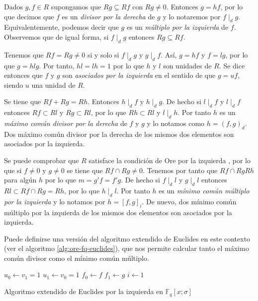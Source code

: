 Dados \(g, f \in R\) supongamos que \(Rg \subseteq Rf\) con \(Rg \neq 0\).
Entonces \(g = hf\), por lo que decimos que \(f\) es un \emph{divisor por la derecha} de \(g\) y lo notaremos por \(f \mid_{d} g\).
Equivalentemente, podemos decir que \(g\) es un \emph{múltiplo por la izquierda} de \(f\).
Observemos que de igual forma, si \(f \mid_{d} g\) entonces \(Rg \subseteq Rf\).

Tenemos que \(Rf = Rg \neq 0\) si y solo si \(f \mid_d g\) y \(g \mid_d f\).
Así, \(g = hf\) y \(f = lg\), por lo que \(g = hlg\).
Por tanto, \(hl = lh = 1\) por lo que \(h\) y \(l\) son unidades de \(R\).
Se dice entonces que \(f\) y \(g\) son \emph{asociados por la izquierda} en el sentido de que \(g = uf\), siendo \(u\) una unidad de \(R\).

Se tiene que \(Rf + Rg = Rh\).
Entonces \(h \mid_d f\) y \(h \mid_d g\).
De hecho si \(l \mid_d f\) y \(l \mid_d f\) entonces \(Rf \subset Rl\) y \(Rg \subset Rl\), por lo que \(Rh \subset Rl\) y \(l \mid_d h\).
Por tanto \(h\) es un \emph{máximo común divisor por la derecha} de \(f\) y \(g\) y lo notamos como \(h = (f, g)_d\).
Dos máximo común divisor por la derecha de los mismos dos elementos son asociados por la izquierda.

Se puede comprobar que \(R\) satisface la condición de Ore por la izquierda \parencite[ver][p. 4]{jacobson_finite-dimensional_1996}, por lo que si \(f \neq 0\) y \(g \neq 0\) se tiene que \(Rf \cap Rg \neq 0\).
Tenemos por tanto que \(Rf \cap Rg Rh\) para algún \(h\) por lo que \(m = g'f = f'g\).
De hecho si \(f \mid_d l\) y \(g \mid_d l\) entonces \(Rl \subset Rf \cap Rg = Rh\), por lo que \(h \mid_d l\).
Por tanto \(h\) es un \emph{mínimo común múltiplo por la izquierda} y lo notamos por \(h = [f, g]_i\).
De nuevo, dos mínimo común múltiplo por la izquierda de los mismos dos elementos son asociados por la izquierda.

Puede definirse una versión del algoritmo extendido de Euclides en este contexto (ver el algoritmo \ref{alg:ore-fq-euclides}), que nos permite calcular tanto el máximo común divisor como el mínimo común múltiplo.

\begin{Ualgorithm}[h]
  \DontPrintSemicolon
  \(u_0 \longleftarrow v_1 = 1\)\;
  \(u_1 \longleftarrow v_0 = 1\)\;
  \(f_0 \longleftarrow f\)\;
  \(f_1 \longleftarrow g\)\;
  \(i \longleftarrow 1\)\;
    \caption{Algoritmo extendido de Euclides por la izquierda en \(\mathbb F_q[x; \sigma]\)
  }
  \label{alg:ore-fq-euclides}
\end{Ualgorithm}
  
